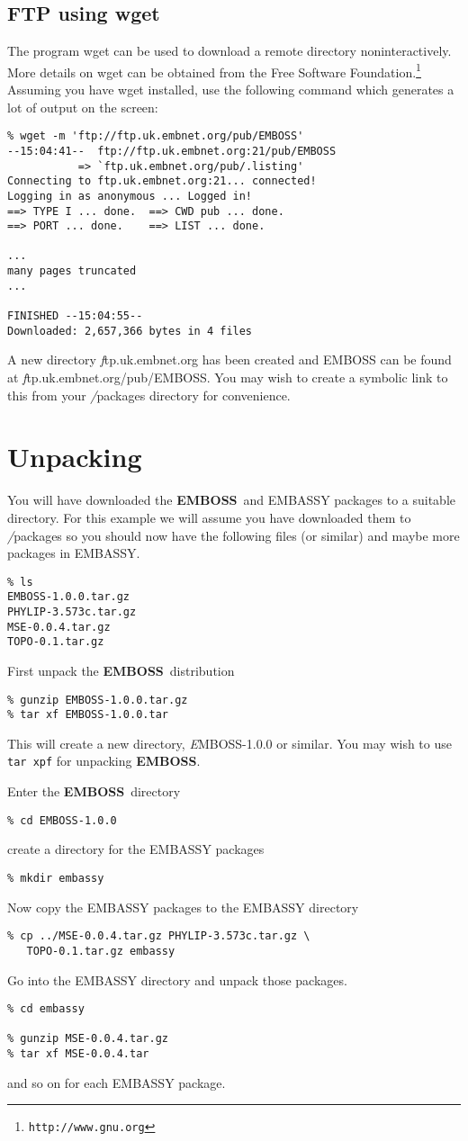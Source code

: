 \documentclass{report}
\newcommand{\ilcomm}[1]{{\tt #1}}
\newcommand{\filename}[1]{{\sf\textsl #1}}
\newcommand{\progname}[1]{{\sc #1}}
\newcommand{\URL}[1]{\footnote{{\tt #1}}}
\newcommand{\EMBOSS}{{\sf\bfseries EMBOSS}}
\begin{document}
\subsection{FTP using \progname{wget}}
The program \progname{wget} can be used to download a remote directory noninteractively. More details on \progname{wget} can be obtained from the Free Software Foundation.\URL{http://www.gnu.org} Assuming you have \progname{wget} installed, use the following command which generates a lot of output on the screen:
\begin{verbatim}
% wget -m 'ftp://ftp.uk.embnet.org/pub/EMBOSS'
--15:04:41--  ftp://ftp.uk.embnet.org:21/pub/EMBOSS
           => `ftp.uk.embnet.org/pub/.listing'
Connecting to ftp.uk.embnet.org:21... connected!
Logging in as anonymous ... Logged in!
==> TYPE I ... done.  ==> CWD pub ... done.
==> PORT ... done.    ==> LIST ... done.

...
many pages truncated
...

FINISHED --15:04:55--
Downloaded: 2,657,366 bytes in 4 files
\end{verbatim}
A new directory \filename{ftp.uk.embnet.org} has been created and EMBOSS can be found at \filename{ftp.uk.embnet.org/pub/EMBOSS}. You may wish to create a symbolic link to this from your \filename{/packages} directory for convenience.


\section{Unpacking}

You will have downloaded the \EMBOSS\ and EMBASSY packages to a suitable directory. For this example we will assume you have downloaded them to \filename{/packages} so you should now have the following files (or similar) and maybe more packages in EMBASSY. 
\begin{verbatim}
% ls
EMBOSS-1.0.0.tar.gz
PHYLIP-3.573c.tar.gz
MSE-0.0.4.tar.gz
TOPO-0.1.tar.gz
\end{verbatim}
First unpack the \EMBOSS\ distribution
\begin{verbatim}
% gunzip EMBOSS-1.0.0.tar.gz
% tar xf EMBOSS-1.0.0.tar
\end{verbatim}
This will create a new directory, \filename{EMBOSS-1.0.0} or similar. You may wish to use \ilcomm{tar xpf} for unpacking \EMBOSS.

Enter the \EMBOSS\ directory
\begin{verbatim}
% cd EMBOSS-1.0.0
\end{verbatim}
create a directory for the EMBASSY packages
\begin{verbatim}
% mkdir embassy
\end{verbatim}
Now copy the EMBASSY packages to the EMBASSY directory
\begin{verbatim}
% cp ../MSE-0.0.4.tar.gz PHYLIP-3.573c.tar.gz \
   TOPO-0.1.tar.gz embassy
\end{verbatim}
Go into the EMBASSY directory and unpack those packages.
\begin{verbatim}
% cd embassy

% gunzip MSE-0.0.4.tar.gz
% tar xf MSE-0.0.4.tar
\end{verbatim}
and so on for each EMBASSY package.
\end{document}
